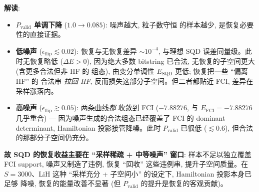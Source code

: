 \documentclass[11pt]{article}
\begin{document}
\textbf{解读}:
\begin{itemize}
  \item \textbf{$P_{\text{valid}}$ 单调下降} ($1.0\to0.085$): 噪声越大, 粒子数守恒
        的样本越少, 是恢复必要性的直接证据。
  \item \textbf{低噪声} ($\epsilon_{\text{flip}}\lesssim0.02$): 恢复与无恢复差异
        $\sim 10^{-4}$, 与理想 SQD 误差同量级。此时无恢复略低 ($\Delta E>0$),
        因为绝大多数 bitstring 已合法, 无恢复的子空间更大 (含更多合法但非 HF 的
        组态), 由变分单调性 $E_{\text{SQD}}$ 更低; 恢复把一些 ``偏离 HF'' 的
        合法串 \emph{拉回 HF}, 反而损失这部分子空间。但二者都贴近 FCI, 差异在
        采样涨落内。
  \item \textbf{高噪声} ($\epsilon_{\text{flip}}\gtrsim0.05$): 两条曲线\emph{都}
        收敛到 FCI ($-7.88276$, 与 $E_{\text{FCI}}{=}-7.88276$ 几乎重合) ---
        因为噪声生成的合法组态已经覆盖了 FCI 的 dominant determinant,
        Hamiltonian 投影接管降噪。此时 $P_{\text{valid}}$ 已很低 ($\lesssim0.6$),
        但合法的那部分子空间仍充分。
\end{itemize}
\textbf{故 SQD 的恢复收益主要在 ``采样稀疏 + 中等噪声'' 窗口}: 样本不足以独立覆盖
FCI support, 噪声又制造了违例, 恢复 ``回收'' 这些违例串, 提升子空间质量。在
$S{=}3000$、LiH 这种 ``采样充分 + 子空间小'' 的设定下, Hamiltonian 投影本身已足够
降噪, 恢复的能量改善不显著 (但 $P_{\text{valid}}$ 的提升是恢复的客观贡献)。
\end{document}
